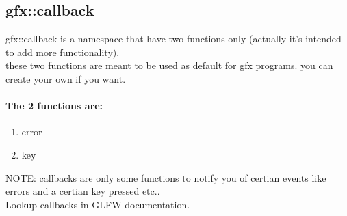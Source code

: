 \subsection{gfx::callback}
gfx::callback is a namespace that have two functions only (actually it's intended to add more functionality).\\
these two functions are meant to be used as default for gfx programs. you can create your own if you want.\\
\paragraph{The 2 functions are:}
\begin{enumerate}
  \item{error}
  \item{key}
\end{enumerate}
NOTE: callbacks are only some functions to notify you of certian events like errors and a certian key pressed etc..\\
Lookup callbacks in GLFW documentation.
